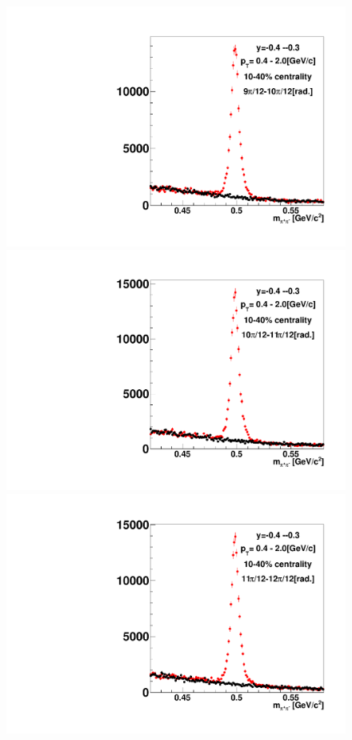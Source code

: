 \begin{figure}[h]
\includegraphics[width=0.14\linewidth]{chapterX/fig/ks_v1_sig/kf_ptslice0_cent1_ks_flow_phi10_rap8_check.pdf}
\includegraphics[width=0.14\linewidth]{chapterX/fig/ks_v1_sig/kf_ptslice0_cent1_ks_flow_phi11_rap8_check.pdf}
\includegraphics[width=0.14\linewidth]{chapterX/fig/ks_v1_sig/kf_ptslice0_cent1_ks_flow_phi12_rap8_check.pdf}


\end{figure}
